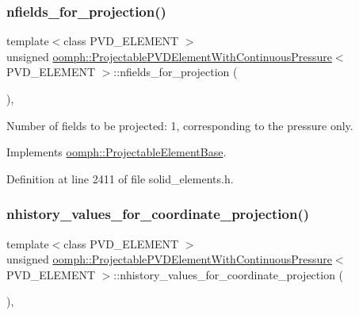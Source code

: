 \subsubsection{\texorpdfstring{nfields\+\_\+for\+\_\+projection()}{nfields\_for\_projection()}}
{\footnotesize\ttfamily template$<$class P\+V\+D\+\_\+\+E\+L\+E\+M\+E\+NT $>$ \\
unsigned \hyperlink{classoomph_1_1ProjectablePVDElementWithContinuousPressure}{oomph\+::\+Projectable\+P\+V\+D\+Element\+With\+Continuous\+Pressure}$<$ P\+V\+D\+\_\+\+E\+L\+E\+M\+E\+NT $>$\+::nfields\+\_\+for\+\_\+projection (\begin{DoxyParamCaption}{ }\end{DoxyParamCaption})\hspace{0.3cm}{\ttfamily [inline]}, {\ttfamily [virtual]}}



Number of fields to be projected\+: 1, corresponding to the pressure only. 



Implements \hyperlink{classoomph_1_1ProjectableElementBase_a44634aa4049332a580d249c25564638c}{oomph\+::\+Projectable\+Element\+Base}.



Definition at line 2411 of file solid\+\_\+elements.\+h.

\mbox{\label{classoomph_1_1ProjectablePVDElementWithContinuousPressure_a67bdc9b19979dc1b77330fb1ab5f9493}} 
\subsubsection{\texorpdfstring{nhistory\+\_\+values\+\_\+for\+\_\+coordinate\+\_\+projection()}{nhistory\_values\_for\_coordinate\_projection()}}
{\footnotesize\ttfamily template$<$class P\+V\+D\+\_\+\+E\+L\+E\+M\+E\+NT $>$ \\
unsigned \hyperlink{classoomph_1_1ProjectablePVDElementWithContinuousPressure}{oomph\+::\+Projectable\+P\+V\+D\+Element\+With\+Continuous\+Pressure}$<$ P\+V\+D\+\_\+\+E\+L\+E\+M\+E\+NT $>$\+::nhistory\+\_\+values\+\_\+for\+\_\+coordinate\+\_\+projection (\begin{DoxyParamCaption}{ }\end{DoxyParamCaption})\hspace{0.3cm}{\ttfamily [inline]}, {\ttfamily [virtual]}}



